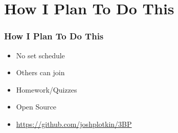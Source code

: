 \documentclass{beamer}
\begin{document}
\section{How I Plan To Do This}
\begin{frame}
\frametitle{How I Plan To Do This}
\begin{itemize}
\item No set schedule
\item Others can join
\item Homework/Quizzes
\item Open Source
\item \url{https://github.com/joshplotkin/3BP}
\end{itemize}
\end{frame}
\end{document}
